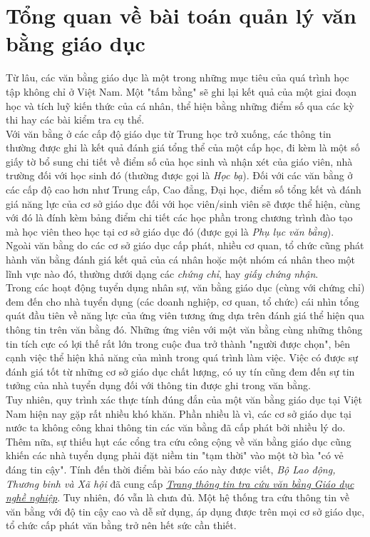 \chapter{Tổng quan về bài toán quản lý văn bằng giáo dục}

Từ lâu, các văn bằng giáo dục là một trong những mục tiêu của quá trình học tập không chỉ ở Việt Nam. Một "tấm bằng" sẽ ghi lại kết quả của một giai đoạn học và tích luỹ kiến thức của cá nhân, thể hiện bằng những điểm số qua các kỳ thi hay các bài kiểm tra cụ thể.\\

Với văn bằng ở các cấp độ giáo dục từ Trung học trở xuống, các thông tin thường được ghi là kết quả đánh giá tổng thể của một cấp học, đi kèm là một số giấy tờ bổ sung chi tiết về điểm số của học sinh và nhận xét của giáo viên, nhà trường đối với học sinh đó (thường được gọi là \textit{Học bạ}). Đối với các văn bằng ở các cấp độ cao hơn như Trung cấp, Cao đẳng, Đại học, điểm số tổng kết và đánh giá năng lực của cơ sở giáo dục đối với học viên/sinh viên sẽ được thể hiện, cùng với đó là đính kèm bảng điểm chi tiết các học phần trong chương trình đào tạo mà học viên theo học tại cơ sở giáo dục đó (được gọi là \textit{Phụ lục văn bằng}).\\

Ngoài văn bằng do các cơ sở giáo dục cấp phát, nhiều cơ quan, tổ chức cũng phát hành văn bằng đánh giá kết quả của cá nhân hoặc một nhóm cá nhân theo một lĩnh vực nào đó, thường dưới dạng các \textit{chứng chỉ}, hay \textit{giấy chứng nhận}.\\

Trong các hoạt động tuyển dụng nhân sự, văn bằng giáo dục (cùng với chứng chỉ) đem đến cho nhà tuyển dụng (các doanh nghiệp, cơ quan, tổ chức) cái nhìn tổng quát đầu tiên về năng lực của ứng viên tương ứng dựa trên đánh giá thể hiện qua thông tin trên văn bằng đó. Những ứng viên với một văn bằng cùng những thông tin tích cực có lợi thế rất lớn trong cuộc đua trở thành "người được chọn", bên cạnh việc thể hiện khả năng của mình trong quá trình làm việc. Việc có được sự đánh giá tốt từ những cơ sở giáo dục chất lượng, có uy tín cũng đem đến sự tin tưởng của nhà tuyển dụng đối với thông tin được ghi trong văn bằng.\\

Tuy nhiên, quy trình xác thực tính đúng đắn của một văn bằng giáo dục tại Việt Nam hiện nay gặp rất nhiều khó khăn. Phần nhiều là vì, các cơ sở giáo dục tại nước ta không công khai thông tin các văn bằng đã cấp phát bởi nhiều lý do. Thêm nữa, sự thiếu hụt các cổng tra cứu công cộng về văn bằng giáo dục cũng khiến các nhà tuyển dụng phải đặt niềm tin "tạm thời" vào một tờ bìa "có vẻ đáng tin cậy". Tính đến thời điểm bài báo cáo này được viết, \textit{Bộ Lao động, Thương binh và Xã hội} đã cung cấp \href{https://vanbang.gdnn.gov.vn/}{\textit{Trang thông tin tra cứu văn bằng Giáo dục nghề nghiệp}}. Tuy nhiên, đó vẫn là chưa đủ. Một hệ thống tra cứu thông tin về văn bằng với độ tin cậy cao và dễ sử dụng, áp dụng được trên mọi cơ sở giáo dục, tổ chức cấp phát văn bằng trở nên hết sức cần thiết.

